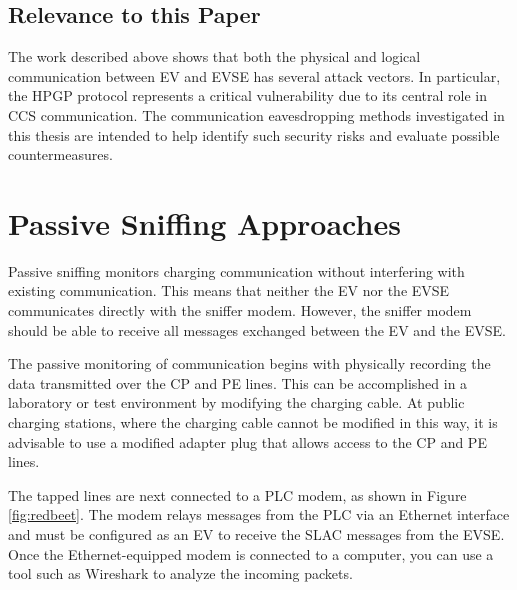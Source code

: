 \documentclass[sigconf]{acmart}
\begin{document}
\subsection{Relevance to this Paper}
The work described above shows that both the physical and logical communication between EV and EVSE has several attack vectors. In particular, the HPGP protocol represents a critical vulnerability due to its central role in CCS communication. The communication eavesdropping methods investigated in this thesis are intended to help identify such security risks and evaluate possible countermeasures.
\fi

\section{Passive Sniffing Approaches}

Passive sniffing monitors charging communication without interfering with existing communication. This means that neither the EV nor the EVSE communicates directly with the sniffer modem. However, the sniffer modem should be able to receive all messages exchanged between the EV and the EVSE.

The passive monitoring of communication begins with physically recording the data transmitted over the CP and PE lines. This can be accomplished in a laboratory or test environment by modifying the charging cable. At public charging stations, where the charging cable cannot be modified in this way, it is advisable to use a modified adapter plug that allows access to the CP and PE lines.

The tapped lines are next connected to a PLC modem, as shown in Figure \ref{fig:redbeet}. The modem relays messages from the PLC via an Ethernet interface and must be configured as an EV to receive the SLAC messages from the EVSE. Once the Ethernet-equipped modem is connected to a computer, you can use a tool such as Wireshark to analyze the incoming packets.
\end{document}
